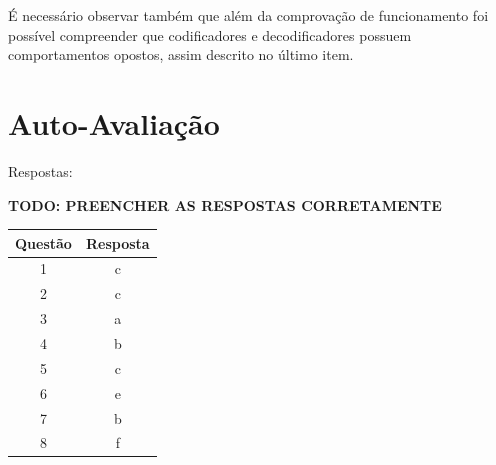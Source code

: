 \documentclass[12pt]{article}
\begin{document}
É necessário observar também que além da comprovação de funcionamento foi
possível compreender que codificadores e decodificadores possuem comportamentos
opostos, assim descrito no último item.


\nocite{*}



\newpage
\section*{Auto-Avaliação}

Respostas:

\textbf{TODO: PREENCHER AS RESPOSTAS CORRETAMENTE}
\begin{table}[H]
      \begin{tabular}{|c|c|} \hline
      \textbf{Questão} & \textbf{Resposta}\\
      \hline
      1 & c \\ \hline
      2 & c \\ \hline
      3 & a \\ \hline
      4 & b \\ \hline
      5 & c \\ \hline
      6 & e \\ \hline
      7 & b \\ \hline
      8 & f \\ \hline
      \end{tabular}
\end{table}
\end{document}
